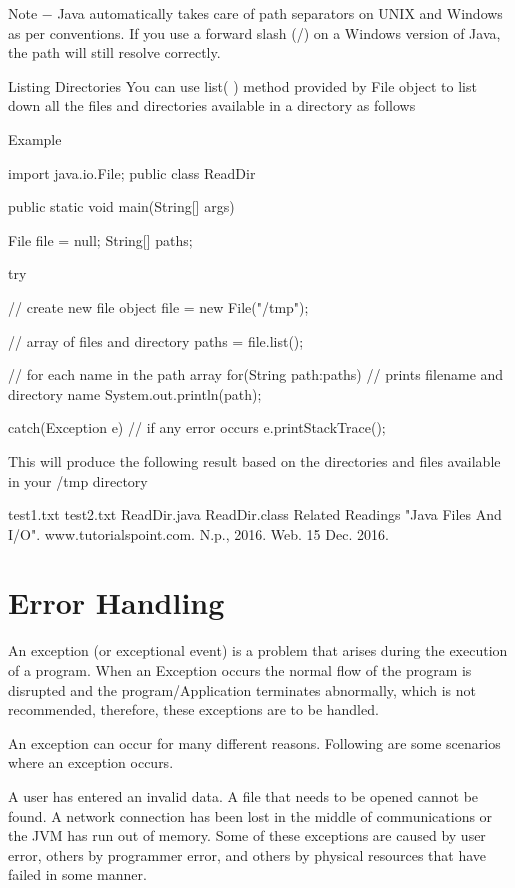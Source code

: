 Note − Java automatically takes care of path separators on UNIX and Windows as per conventions. If you use a forward slash (/) on a Windows version of Java, the path will still resolve correctly.

Listing Directories
You can use list( ) method provided by File object to list down all the files and directories available in a directory as follows

Example

import java.io.File;
public class ReadDir {

   public static void main(String[] args) {
      File file = null;
      String[] paths;

      try {
         // create new file object
         file = new File("/tmp");

         // array of files and directory
         paths = file.list();

         // for each name in the path array
         for(String path:paths) {
            // prints filename and directory name
            System.out.println(path);
         }
      }catch(Exception e) {
         // if any error occurs
         e.printStackTrace();
      }
   }
}
This will produce the following result based on the directories and files available in your /tmp directory

test1.txt
test2.txt
ReadDir.java
ReadDir.class
Related Readings
"Java Files And I/O". www.tutorialspoint.com. N.p., 2016. Web. 15 Dec. 2016.

\section{Error Handling}

An exception (or exceptional event) is a problem that arises during the execution of a program. When an Exception occurs the normal flow of the program is disrupted and the program/Application terminates abnormally, which is not recommended, therefore, these exceptions are to be handled.

An exception can occur for many different reasons. Following are some scenarios where an exception occurs.

A user has entered an invalid data.
A file that needs to be opened cannot be found.
A network connection has been lost in the middle of communications or the JVM has run out of memory.
Some of these exceptions are caused by user error, others by programmer error, and others by physical resources that have failed in some manner.

